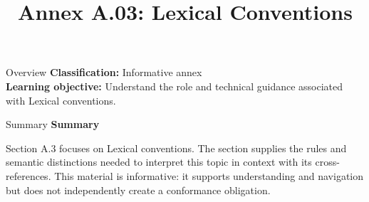 \documentclass[10pt,letterpaper]{article}
\title{Annex A.03: Lexical Conventions}
\author{}
\date{}
\begin{document}
\maketitle
\begin{CornellOverviewBox}{Overview}
\textbf{Classification:} Informative annex\\[2pt]
\textbf{Learning objective:} Understand the role and technical guidance associated with Lexical conventions.
\end{CornellOverviewBox}\begin{CornellSummaryBox}{Summary}
{\sffamily\bfseries\color{Accent} Summary}\par\vspace{3pt}Section A.3 focuses on Lexical conventions. The section supplies the rules and semantic distinctions needed to interpret this topic in context with its cross-references. This material is informative: it supports understanding and navigation but does not independently create a conformance obligation.
\end{CornellSummaryBox}
\end{document}
